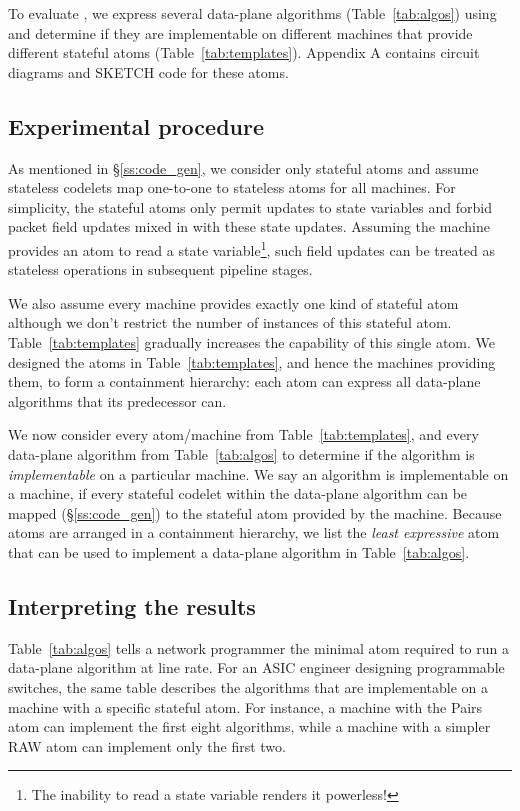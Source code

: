 To evaluate \pktlanguage, we express several data-plane algorithms
(Table~\ref{tab:algos}) using \pktlanguage and determine if they are
implementable on different \absmachine machines that provide different stateful
atoms (Table~\ref{tab:templates}). Appendix A contains circuit diagrams and
SKETCH code for these atoms.

\subsection{Experimental procedure}
As mentioned in \S\ref{ss:code_gen}, we consider only stateful atoms and assume
stateless codelets map one-to-one to stateless atoms for all \absmachine
machines. For simplicity, the stateful atoms only permit updates to state
variables and forbid packet field updates mixed in with these state updates.
Assuming the \absmachine machine provides an atom to read a state
variable\footnote{The inability to read a state variable renders it
powerless!}, such field updates can be treated as stateless operations in
subsequent pipeline stages.

We also assume every \absmachine machine provides exactly one kind of stateful
atom although we don't restrict the number of instances of this stateful atom.
Table~\ref{tab:templates} gradually increases the capability of this single
atom.  We designed the atoms in Table~\ref{tab:templates}, and hence the
\absmachine machines providing them, to form a containment hierarchy: each atom
can express all data-plane algorithms that its predecessor can.

We now consider every atom/\absmachine machine from Table~\ref{tab:templates},
and every data-plane algorithm from Table~\ref{tab:algos} to determine if the
algorithm is \textit{implementable} on a particular \absmachine machine. We say
an algorithm is implementable on a \absmachine machine, if every stateful
codelet within the data-plane algorithm can be mapped (\S\ref{ss:code_gen}) to
the stateful atom provided by the \absmachine machine. Because atoms are
arranged in a containment hierarchy, we list the \textit{least expressive} atom
that can be used to implement a data-plane algorithm in Table~\ref{tab:algos}.

\subsection{Interpreting the results}
Table~\ref{tab:algos} tells a network programmer the minimal atom required to
run a data-plane algorithm at line rate. For an ASIC engineer designing
programmable switches, the same table describes the algorithms that are
implementable on a \absmachine machine with a specific stateful atom. For
instance, a \absmachine machine with the Pairs atom can implement the first
eight algorithms, while a machine with a simpler RAW atom can implement only
the first two.

